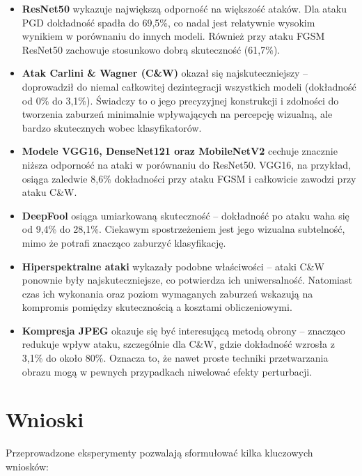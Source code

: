 \documentclass{article}
\begin{document}
\begin{itemize}
    \item \textbf{ResNet50} wykazuje największą odporność na większość ataków. Dla ataku PGD dokładność spadła do 69{,}5\%, co nadal jest relatywnie wysokim wynikiem w porównaniu do innych modeli. Również przy ataku FGSM ResNet50 zachowuje stosunkowo dobrą skuteczność (61{,}7\%).
    
    \item \textbf{Atak Carlini \& Wagner (C\&W)} okazał się najskuteczniejszy – doprowadził do niemal całkowitej dezintegracji wszystkich modeli (dokładność od 0\% do 3{,}1\%). Świadczy to o jego precyzyjnej konstrukcji i zdolności do tworzenia zaburzeń minimalnie wpływających na percepcję wizualną, ale bardzo skutecznych wobec klasyfikatorów.
    
    \item \textbf{Modele VGG16, DenseNet121 oraz MobileNetV2} cechuje znacznie niższa odporność na ataki w porównaniu do ResNet50. VGG16, na przykład, osiąga zaledwie 8{,}6\% dokładności przy ataku FGSM i całkowicie zawodzi przy ataku C\&W.
    
    \item \textbf{DeepFool} osiąga umiarkowaną skuteczność – dokładność po ataku waha się od 9{,}4\% do 28{,}1\%. Ciekawym spostrzeżeniem jest jego wizualna subtelność, mimo że potrafi znacząco zaburzyć klasyfikację.
    
    \item \textbf{Hiperspektralne ataki} wykazały podobne właściwości – ataki C\&W ponownie były najskuteczniejsze, co potwierdza ich uniwersalność. Natomiast czas ich wykonania oraz poziom wymaganych zaburzeń wskazują na kompromis pomiędzy skutecznością a kosztami obliczeniowymi.
    
    \item \textbf{Kompresja JPEG} okazuje się być interesującą metodą obrony – znacząco redukuje wpływ ataku, szczególnie dla C\&W, gdzie dokładność wzrosła z 3{,}1\% do około 80\%. Oznacza to, że nawet proste techniki przetwarzania obrazu mogą w pewnych przypadkach niwelować efekty perturbacji.
\end{itemize}

\section{Wnioski}

Przeprowadzone eksperymenty pozwalają sformułować kilka kluczowych wniosków:
\end{document}
